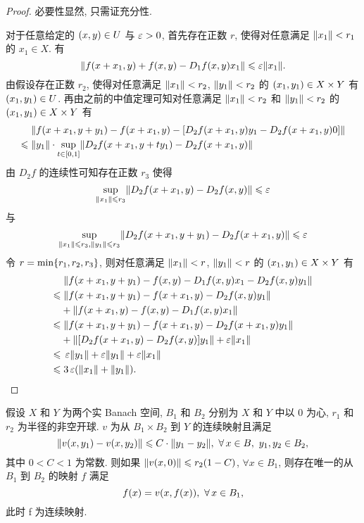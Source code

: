 \begin{proof}
必要性显然, 只需证充分性.\par 
对于任意给定的 $\left(x,y\right)\in U$ 与 $\operatorname{\varepsilon}>0$, 首先存在正数 $r$, 使得对任意满足 $\left\Vert x_{1}\right\Vert<r_{1}$ 的 $x_{1}\in X$. 有
\[\fs{f\xk{x+x_{1},y}+f\xk{x,y}-D_{1}f\xk{x,y}x_{1}}\leq\eps\fs{x_{1}}.\]
由假设存在正数 $r_{2}$, 使得对任意满足 $\left\Vert x_{1}\right\Vert<r_{2}$, $\left\Vert y_{1}\right\Vert<r_{2}$ 的 $\left(x_{1},y_{1}\right)\in X\times Y$ 有 $\left(x_{1},y_{1}\right)\in U$. 再由之前的中值定理可知对任意满足 $\left\Vert x_{1}\right\Vert<r_{2}$ 和 $\left\Vert y_{1}\right\Vert<r_{2}$ 的 $\left(x_{1},y_{1}\right)\in X\times Y$ 有
\begin{align*}
&\;\fs{f\xk{x+x_{1},y+y_{1}}-f\xk{x+x_{1},y}-\zk{D_{2}f\xk{x+x_{1},y}y_{1}-D_{2}f\xk{x+x_{1},y}0}}\\
\leq&\;\fs{y_{1}}\cdot\sup _{t\in\zk{0,1}}\fs{D_{2}f\xk{x+x_{1},y+ty_{1}}-D_{2}f\xk{x+x_{1},y}}
\end{align*}
由 $D_{2}f$ 的连续性可知存在正数 $r_{3}$ 使得
\[\sup _{\fs{x_{1}}\leq r_{3}}\fs{D_{2}f\xk{x+x_{1},y}-D_{2}f\xk{x,y}}\leq\eps\]
与
\[\sup _{\fs{x_{1}}\leq r_{3},\fs{y_{1}}\leq r_{3}}\fs{D_{2}f\xk{x+x_{1},y+y_{1}}-D_{2}f\xk{x+x_{1},y}}\leq\eps\]
令 $r=\min\dk{r_{1},r_{2},r_{3}}$, 则对任意满足 $\left\Vert x_{1}\right\Vert<r$, $\left\Vert y_{1}\right\Vert<r$ 的 $\left(x_{1},y_{1}\right)\in X\times Y$ 有
\begin{align*}
&\;\fs{f\xk{x+x_{1},y+y_{1}}-f\xk{x,y}-D_{1}f\xk{x,y}x_{1}-D_{2}f\xk{x,y}y_{1}}\\
\leq&\;\fs{f\xk{x+x_{1},y+y_{1}}-f\xk{x+x_{1},y}-D_{2}f\xk{x,y}y_{1}}\\
&+\fs{f\xk{x+x_{1},y}-f\xk{x,y}-D_{1}f\xk{x,y}x_{1}}\\
\leq&\;\fs{f\xk{x+x_{1},y+y_{1}}-f\xk{x+x_{1},y}-D_{2}f\xk{x+x_{1},y}y_{1}}\\
&+\fs{\zk{D_{2}f\xk{x+x_{1},y}-D_{2}f\xk{x,y}}y_{1}}+\eps\fs{x_{1}}\\
\leq&\;\eps\fs{y_{1}}+\eps\fs{y_{1}}+\eps\fs{x_{1}}\\
\leq&\;3\eps\xk{\fs{x_{1}}+\fs{y_{1}}}.\qedhere
\end{align*}
\end{proof}
\begin{theorem}[不动点定理]
假设 $X$ 和 $Y$ 为两个实 Banach 空间, $B_{1}$ 和 $B_{2}$ 分别为 $X$ 和 $Y$ 中以 $0$ 为心, $r_{1}$ 和 $r_{2}$ 为半径的非空开球. $v$ 为从 $B_{1}\times B_{2}$ 到 $Y$ 的连续映射且满足
\[\fs{v\xk{x,y_{1}}-v\xk{x,y_{2}}}\leq C\cdot\fs{y_{1}-y_{2}},\ \forall x\in B,\ y_{1},y_{2}\in B_{2},\]
其中 $0<C<1$ 为常数. 则如果 $\fs{v\xk{x,0}}\leq r_{2}\xk{1-C}$, $\forall x\in B_{1}$, 则存在唯一的从 $B_{1}$ 到 $B_{2}$ 的映射 $f$ 满足
\[f\xk{x}=v\xk{x,f\xk{x}},\ \forall x\in B_{1},\]
此时 f 为连续映射.
\end{theorem}
